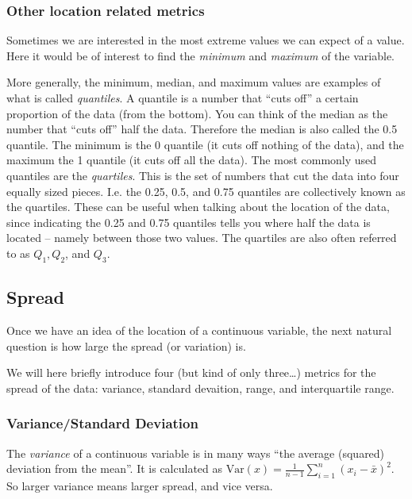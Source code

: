 \documentclass[]{book}
\theoremstyle{definition}
\theoremstyle{definition}
\theoremstyle{definition}
\theoremstyle{remark}
\begin{document}
\hypertarget{other-location-related-metrics}{%
\subsubsection{Other location related metrics}\label{other-location-related-metrics}}

Sometimes we are interested in the most extreme values we can expect of a value. Here it would be of interest to find the \emph{minimum} and \emph{maximum} of the variable.

More generally, the minimum, median, and maximum values are examples of what is called \emph{quantiles}. A quantile is a number that ``cuts off'' a certain proportion of the data (from the bottom). You can think of the median as the number that ``cuts off'' half the data. Therefore the median is also called the 0.5 quantile. The minimum is the 0 quantile (it cuts off nothing of the data), and the maximum the 1 quantile (it cuts off all the data). The most commonly used quantiles are the \emph{quartiles}. This is the set of numbers that cut the data into four equally sized pieces. I.e. the 0.25, 0.5, and 0.75 quantiles are collectively known as the quartiles. These can be useful when talking about the location of the data, since indicating the 0.25 and 0.75 quantiles tells you where half the data is located -- namely between those two values. The quartiles are also often referred to as \(Q_1, Q_2\), and \(Q_3\).

\hypertarget{spread}{%
\subsection{Spread}\label{spread}}

Once we have an idea of the location of a continuous variable, the next natural question is how large the spread (or variation) is.

We will here briefly introduce four (but kind of only three\ldots) metrics for the spread of the data: variance, standard devaition, range, and interquartile range.

\hypertarget{var-std-dev}{%
\subsubsection{Variance/Standard Deviation}\label{var-std-dev}}

The \emph{variance} of a continuous variable is in many ways ``the average (squared) deviation from the mean''. It is calculated as \(\text{Var}(x) = \frac{1}{n-1} \sum_{i=1}^n (x_i - \bar{x})^2\). So larger variance means larger spread, and vice versa.
\end{document}
